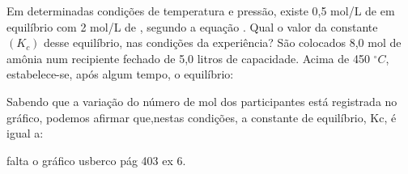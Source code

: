 \documentclass[a4paper,12]{exam}
\begin{document}
\begin{multicols}{2}
\begin{questions}
				\question Em determinadas condições de temperatura e pressão, existe 0,5 mol/L de  em equilíbrio com 2 mol/L de , segundo a equação . Qual o valor da constante $(K_c)$ desse equilíbrio, nas condições da experiência?
				\makeemptybox{2cm}
				\question São colocados 8,0 mol de amônia num recipiente fechado de 5,0 litros de capacidade. Acima de 450 $^{\circ}C$, estabelece-se, após algum tempo, o equilíbrio:
				\begin{center}
				\end{center}
				Sabendo que a variação do número de mol dos participantes está registrada no gráfico, podemos afirmar que,nestas condições, a constante de equilíbrio, Kc, é igual a:

				falta o gráfico usberco pág 403 ex 6.

				\makeemptybox{2cm}
	\end{questions}	
\end{multicols}
\end{document}
